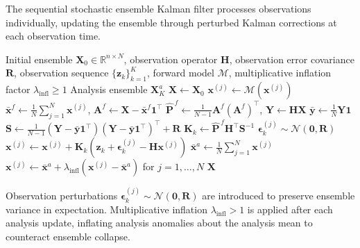 \documentclass[11pt,a4paper]{article}
\begin{document}
The sequential stochastic ensemble Kalman filter processes observations individually, updating the ensemble through perturbed Kalman corrections at each observation time.

\begin{algorithm}[H]
\caption{Sequential Stochastic Ensemble Kalman Filter}
\label{alg:seq_enkf_appendix}
\begin{algorithmic}[1]
\Require Initial ensemble $\mathbf{X}_0 \in \mathbb{R}^{n \times N}$, observation operator $\mathbf{H}$, observation error covariance $\mathbf{R}$, observation sequence $\{\mathbf{z}_k\}_{k=1}^K$, forward model $\mathcal{M}$, multiplicative inflation factor $\lambda_{\mathrm{infl}} \geq 1$
\Ensure Analysis ensemble $\mathbf{X}_K^a$
\State $\mathbf{X} \gets \mathbf{X}_0$
        \State $\mathbf{x}^{(j)} \gets \mathcal{M}(\mathbf{x}^{(j)})$ 
    \EndFor
    \State $\bar{\mathbf{x}}^f \gets \frac{1}{N}\sum_{j=1}^{N}\mathbf{x}^{(j)}$, \quad $\mathbf{A}^f \gets \mathbf{X} - \bar{\mathbf{x}}^f\mathbf{1}^{\top}$ 
    \State $\widehat{\mathbf{P}}^{\,f} \gets \frac{1}{N-1}\mathbf{A}^f(\mathbf{A}^f)^{\top}$, \quad $\mathbf{Y} \gets \mathbf{H}\mathbf{X}$
    \State $\bar{\mathbf{y}} \gets \frac{1}{N}\mathbf{Y}\mathbf{1}$ 
    \State $\mathbf{S} \gets \frac{1}{N-1}(\mathbf{Y} - \bar{\mathbf{y}}\mathbf{1}^{\top})(\mathbf{Y} - \bar{\mathbf{y}}\mathbf{1}^{\top})^{\top} + \mathbf{R}$
    \State $\mathbf{K}_k \gets \widehat{\mathbf{P}}^{\,f}\mathbf{H}^{\top}\mathbf{S}^{-1}$
        \State $\boldsymbol{\epsilon}_{k}^{(j)} \sim \mathcal{N}(\mathbf{0}, \mathbf{R})$
        \State $\mathbf{x}^{(j)} \gets \mathbf{x}^{(j)} + \mathbf{K}_k(\mathbf{z}_k + \boldsymbol{\epsilon}_{k}^{(j)} - \mathbf{H}\mathbf{x}^{(j)})$ 
    \EndFor
    \State $\bar{\mathbf{x}}^a \gets \frac{1}{N}\sum_{j=1}^{N}\mathbf{x}^{(j)}$
    \State $\mathbf{x}^{(j)} \gets \bar{\mathbf{x}}^a + \lambda_{\mathrm{infl}}(\mathbf{x}^{(j)} - \bar{\mathbf{x}}^a)$ for $j=1,\ldots,N$ 
\EndFor
\State \Return $\mathbf{X}$
\end{algorithmic}
\end{algorithm}

Observation perturbations $\boldsymbol{\epsilon}_{k}^{(j)} \sim \mathcal{N}(\mathbf{0}, \mathbf{R})$ are introduced to preserve ensemble variance in expectation. Multiplicative inflation $\lambda_{\mathrm{infl}} > 1$ is applied after each analysis update, inflating analysis anomalies about the analysis mean to counteract ensemble collapse.
\end{document}
